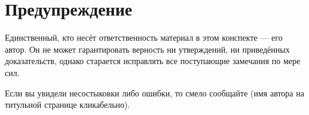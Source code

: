 \section*{Предупреждение}

Единственный, кто несёт ответственность материал в этом конспекте --- его автор. Он не может гарантировать верность ни утверждений, ни приведённых доказательств, однако старается исправлять все поступающие замечания по мере сил.

Если вы увидели несостыковки либо ошибки, то смело сообщайте (имя автора на титульной странице кликабельно).